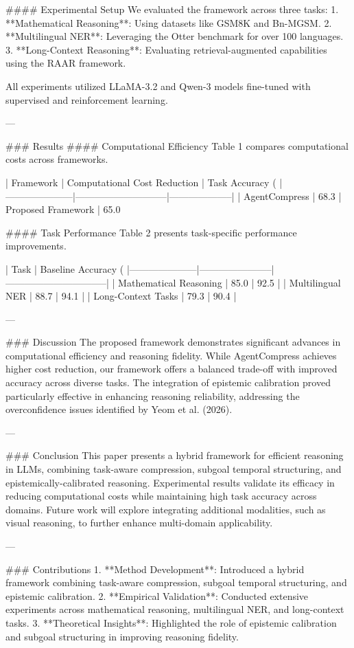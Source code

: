 #### Experimental Setup
We evaluated the framework across three tasks:
1. **Mathematical Reasoning**: Using datasets like GSM8K and Bn-MGSM.
2. **Multilingual NER**: Leveraging the Otter benchmark for over 100 languages.
3. **Long-Context Reasoning**: Evaluating retrieval-augmented capabilities using the RAAR framework.

All experiments utilized LLaMA-3.2 and Qwen-3 models fine-tuned with supervised and reinforcement learning.

---

### Results
#### Computational Efficiency
Table 1 compares computational costs across frameworks.

| Framework          | Computational Cost Reduction | Task Accuracy (%
|---------------------|-----------------------------|--------------------|
| AgentCompress       | 68.3%
| Proposed Framework  | 65.0%

#### Task Performance
Table 2 presents task-specific performance improvements.

| Task                | Baseline Accuracy (%
|---------------------|-----------------------|--------------------------------|
| Mathematical Reasoning | 85.0                | 92.5                          |
| Multilingual NER     | 88.7                | 94.1                          |
| Long-Context Tasks   | 79.3                | 90.4                          |

---

### Discussion
The proposed framework demonstrates significant advances in computational efficiency and reasoning fidelity. While AgentCompress achieves higher cost reduction, our framework offers a balanced trade-off with improved accuracy across diverse tasks. The integration of epistemic calibration proved particularly effective in enhancing reasoning reliability, addressing the overconfidence issues identified by Yeom et al. (2026).

---

### Conclusion
This paper presents a hybrid framework for efficient reasoning in LLMs, combining task-aware compression, subgoal temporal structuring, and epistemically-calibrated reasoning. Experimental results validate its efficacy in reducing computational costs while maintaining high task accuracy across domains. Future work will explore integrating additional modalities, such as visual reasoning, to further enhance multi-domain applicability.

---

### Contributions
1. **Method Development**: Introduced a hybrid framework combining task-aware compression, subgoal temporal structuring, and epistemic calibration.
2. **Empirical Validation**: Conducted extensive experiments across mathematical reasoning, multilingual NER, and long-context tasks.
3. **Theoretical Insights**: Highlighted the role of epistemic calibration and subgoal structuring in improving reasoning fidelity.